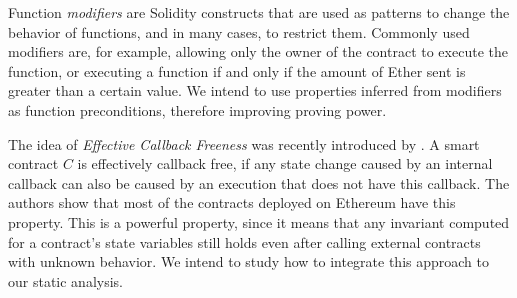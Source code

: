 Function \emph{modifiers} are Solidity constructs that are used as patterns to
change the behavior of functions, and in many cases, to restrict them.
%
Commonly used modifiers are, for example, allowing only the owner of the
contract to execute the function, or executing a function if and only if the
amount of Ether sent is greater than a certain value.
%
We intend to use properties inferred from modifiers as function preconditions,
therefore improving proving power.

The idea of \emph{Effective Callback Freeness} was recently introduced by
\cite{Grossman}.
%
A smart contract $C$ is effectively callback free, if any state change caused
by an internal callback can also be caused by an execution that does not have this callback.
%
The authors show that most of the contracts deployed on Ethereum have this
property.
%
This is a powerful property, since it means that any invariant computed for a
contract's state variables still holds even after calling external contracts
with unknown behavior.
%
We intend to study how to integrate this approach to our static analysis.
